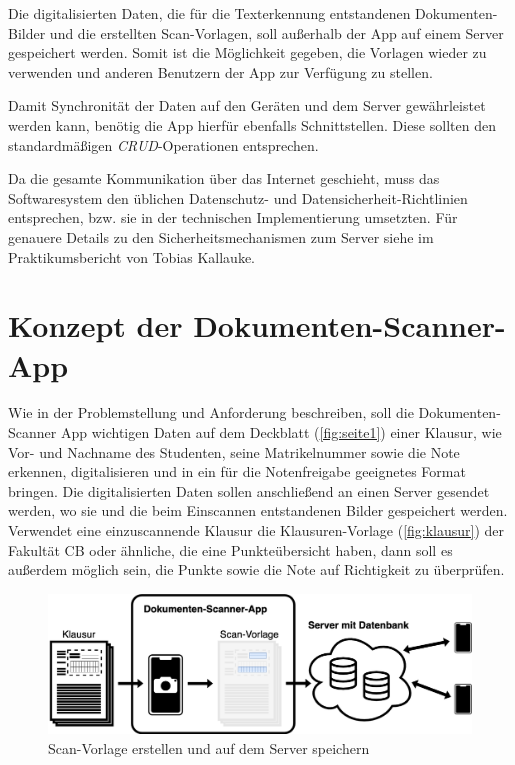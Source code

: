 \documentclass[nomenclature, oneside, 150]{HSMW-Thesis}
\begin{document}
	Die digitalisierten Daten, die für die Texterkennung entstandenen Dokumenten-Bilder und die erstellten Scan-Vorlagen, soll außerhalb der App auf einem Server gespeichert werden. Somit ist die Möglichkeit gegeben, die Vorlagen wieder zu verwenden und anderen Benutzern der App zur Verfügung zu stellen. 
	
	Damit Synchronität der Daten auf den Geräten und dem Server gewährleistet werden kann, benötig die App hierfür ebenfalls Schnittstellen. Diese sollten den standardmäßigen \textit{CRUD}-Operationen entsprechen. 
	
	Da die gesamte Kommunikation über das Internet geschieht, muss das Softwaresystem den üblichen Datenschutz- und Datensicherheit-Richtlinien entsprechen, bzw. sie in der technischen Implementierung umsetzten. Für genauere Details zu den Sicherheitsmechanismen zum Server siehe im Praktikumsbericht von Tobias Kallauke. 


\chapter{Konzept der Dokumenten-Scanner-App}\label{ch:konzept}
	Wie in der Problemstellung und Anforderung beschreiben, soll die Dokumenten-Scanner App wichtigen Daten auf dem Deckblatt (\ref{fig:seite1}) einer Klausur, wie Vor- und Nachname des Studenten, seine Matrikelnummer sowie die Note erkennen, digitalisieren und in ein für die Notenfreigabe geeignetes Format bringen. Die digitalisierten Daten sollen anschließend an einen Server gesendet werden, wo sie und die beim Einscannen entstandenen Bilder gespeichert werden. Verwendet eine einzuscannende Klausur die Klausuren-Vorlage (\ref{fig:klausur}) der Fakultät CB oder ähnliche, die eine Punkteübersicht haben, dann soll es außerdem möglich sein, die Punkte sowie die Note auf Richtigkeit zu überprüfen. 
	
	\begin{figure}[th]
    	\centering
    	\includegraphics[width=\textwidth]{img/schema1}
    	\caption{Scan-Vorlage erstellen und auf dem Server speichern}
    	\label{fig:schema1}
    \end{figure}
\end{document}

